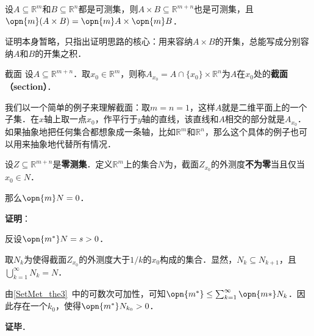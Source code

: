 \begin{theorem}{}
设$A\subseteq\mathbb{R}^m$和$B\subseteq\mathbb{R}^n$都是可测集，则$A\times B \subseteq \mathbb{R}^{m+n}$也是可测集，且$\opn{m}(A\times B)=\opn{m}A\times \opn{m}B$．
\end{theorem}

证明本身暂略，只指出证明思路的核心：用来容纳$A\times B$的开集，总能写成分别容纳$A$和$B$的开集之积．

\begin{definition}{截面}
设$A\subseteq\mathbb{R}^{m+n}$．取$x_0\in \mathbb{R}^m$，则称$A_{x_0}=A\cap \{x_0\}\times \mathbb{R}^n$为$A$在$x_0$处的\textbf{截面（section）}．
\end{definition}

我们以一个简单的例子来理解截面：取$m=n=1$，这样$A$就是二维平面上的一个子集．在$x$轴上取一点$x_0$，作平行于$y$轴的直线，该直线和$A$相交的部分就是$A_{x_0}$．如果抽象地把任何集合都想象成一条轴，比如$\mathbb{R}^m$和$\mathbb{R}^n$，那么这个具体的例子也可以用来抽象地代替所有情况．

\begin{theorem}{}
设$Z\subseteq \mathbb{R}^{m+n}$是\textbf{零测集}．定义$\mathbb{R}^m$上的集合$N$为，截面$Z_{x_0}$的外测度\textbf{不为零}当且仅当$x_0\in N$．

那么$\opn{m}N=0$．
\end{theorem}

\textbf{证明}：

反设$\opn{m^*}N=s>0$．

取$N_k$为使得截面$Z_{x_0}$的外测度大于$1/k$的$x_0$构成的集合．显然，$N_k\subseteq N_{k+1}$，且$\bigcup_{k=1}^\infty N_k=N$．

由\autoref{SetMet_the3}~中的可数次可加性，可知$\opn{m^*}\leq \sum_{k=1}^\infty \opn{m*}N_k$．因此存在一个$k_0$，使得$\opn{m^*}N_{k_0}>0$．

\textbf{证毕}．
















